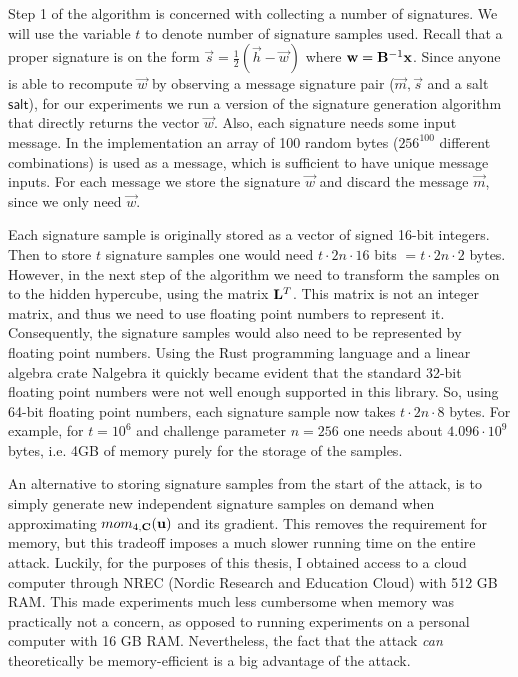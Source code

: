 Step 1 of the algorithm is concerned with collecting a number of signatures. We will use the variable $t$ to denote number of signature samples used.
Recall that a proper signature is on the form $\vec{s} = \frac{1}{2}(\vec{h} - \vec{w})$ where $\mathbf{w} = \mathbf{B}^{-1} \mathbf{x}$. Since anyone is able to recompute $\vec{w}$ by observing a message signature pair 
($\vec{m}, \vec{s}$ and a salt $\mathsf{salt}$), for our experiments we run a version of the signature generation algorithm that directly returns the vector $\vec{w}$.
Also, each signature needs some input message. In the implementation an array of 100 random bytes ($256^{100}$ different combinations) is used as a message, which is sufficient to have unique message inputs.
For each message we store the signature $\vec{w}$ and discard the message $\vec{m}$, since we only need $\vec{w}$.

Each signature sample is originally stored as a vector of signed 16-bit integers. Then to store $t$ signature samples one would need $t \cdot 2n \cdot 16$ bits $= t \cdot 2n \cdot 2$ bytes.
However, in the next step of the algorithm we need to transform the samples on to the hidden hypercube, using the matrix $\mathbf{L}^{T}$. This matrix is not an integer matrix, and thus we need to use floating point numbers 
to represent it. Consequently, the signature samples would also need to be represented by floating point numbers.
Using the Rust programming language and a linear algebra crate Nalgebra \cite{Nalgebra} it quickly became evident that the standard 32-bit floating point numbers were not well enough supported in this library.
So, using 64-bit floating point numbers, each signature sample now takes $t \cdot 2n \cdot 8$ bytes. For example, for $t = 10^6$ and challenge parameter $n=256$ one needs about $4.096 \cdot 10^{9}$ bytes, i.e. 4GB of memory purely
for the storage of the samples.

An alternative to storing signature samples from the start of the attack, is to simply generate new independent signature samples on demand when approximating $mom_{4, \mathbf{C}}(\mathbf{u})$ and its gradient. 
This removes the requirement for memory, but this tradeoff imposes a much slower running time on the entire attack. Luckily, for the purposes of this thesis, I obtained access to a cloud computer through NREC (Nordic Research and Education Cloud)
with 512 GB RAM. This made experiments much less cumbersome when memory was practically not a concern, as opposed to running experiments on a personal computer with 16 GB RAM. Nevertheless, the fact that the attack \textit{can} theoretically
be memory-efficient is a big advantage of the attack.

